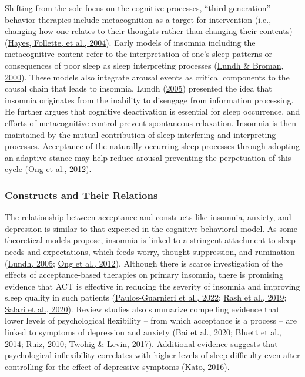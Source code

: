 \documentclass[
  ,doc,11pt, twoside,floatsintext]{apa6}
\begin{document}
Shifting from the sole focus on the cognitive processes, ``third generation'' behavior therapies include metacognition as a target for intervention (i.e., changing how one relates to their thoughts rather than changing their contents) (\protect\hyperlink{ref-hayes2004mindfulness}{Hayes, Follette, et al., 2004}). Early models of insomnia including the metacognitive content refer to the interpretation of one's sleep patterns or consequences of poor sleep as sleep interpreting processes (\protect\hyperlink{ref-lundh2000}{Lundh \& Broman, 2000}). These models also integrate arousal events as critical components to the causal chain that leads to insomnia. Lundh (\protect\hyperlink{ref-lundh2005}{2005}) presented the idea that insomnia originates from the inability to disengage from information processing. He further argues that cognitive deactivation is essential for sleep occurrence, and efforts of metacognitive control prevent spontaneous relaxation. Insomnia is then maintained by the mutual contribution of sleep interfering and interpreting processes. Acceptance of the naturally occurring sleep processes through adopting an adaptive stance may help reduce arousal preventing the perpetuation of this cycle (\protect\hyperlink{ref-ong2012}{Ong et al., 2012}).

\hypertarget{constructs-and-their-relations-1}{%
\subsubsection{Constructs and Their Relations}\label{constructs-and-their-relations-1}}

The relationship between acceptance and constructs like insomnia, anxiety, and depression is similar to that expected in the cognitive behavioral model. As some theoretical models propose, insomnia is linked to a stringent attachment to sleep needs and expectations, which feeds worry, thought suppression, and rumination (\protect\hyperlink{ref-lundh2005}{Lundh, 2005}; \protect\hyperlink{ref-ong2012}{Ong et al., 2012}). Although there is scarce investigation of the effects of acceptance-based therapies on primary insomnia, there is promising evidence that ACT is effective in reducing the severity of insomnia and improving sleep quality in such patients (\protect\hyperlink{ref-paulos-guarnieri2022}{Paulos-Guarnieri et al., 2022}; \protect\hyperlink{ref-rash2019}{Rash et al., 2019}; \protect\hyperlink{ref-salari2020}{Salari et al., 2020}). Review studies also summarize compelling evidence that lower levels of psychological flexibility -- from which acceptance is a process -- are linked to symptoms of depression and anxiety (\protect\hyperlink{ref-bai2020}{Bai et al., 2020}; \protect\hyperlink{ref-bluett2014}{Bluett et al., 2014}; \protect\hyperlink{ref-ruiz2010}{Ruiz, 2010}; \protect\hyperlink{ref-twohig2017}{Twohig \& Levin, 2017}). Additional evidence suggests that psychological inflexibility correlates with higher levels of sleep difficulty even after controlling for the effect of depressive symptoms (\protect\hyperlink{ref-kato2016}{Kato, 2016}).
\end{document}
